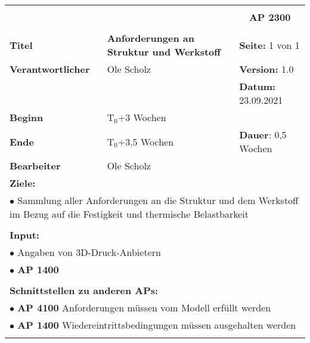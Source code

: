 \clearpage
\begin{table}[!h]
	\begin{center}
		\begin{tabular}{|p{35mm}||p{55mm}|p{50mm}||p{40mm}|}
			\hline
			\multicolumn{3}{|l||}{\textbf{}} & \multicolumn{1}{c|}{}\\
			\multicolumn{3}{|l||}{\textbf{}} & \multicolumn{1}{c|}{\textbf{AP 2300}}\\
			\multicolumn{3}{|l||}{\textbf{}} & \multicolumn{1}{c|}{}\\
			\hline\hline
			\textbf{Titel} & \multicolumn{2}{p{7cm}||}{\textbf{Anforderungen an Struktur und Werkstoff}} 
			& \textbf{Seite:} 1 von 1\\
			\hline
			\textbf{Verantwortlicher} & \multicolumn{2}{l||}{Ole Scholz} & \textbf{Version:} 1.0\\
			\hline
			\multicolumn{3}{|l||}{} & \textbf{Datum:} 23.09.2021\\
			\hline\hline
			\textbf{Beginn} & \multicolumn{2}{l||}{T$_0$+3 Wochen} & \\
			\hline
			\textbf{Ende} & \multicolumn{2}{l||}{T$_0$+3,5 Wochen} & \textbf{Dauer}: 0,5 Wochen\\
			\hline\hline
			\textbf{Bearbeiter} & \multicolumn{3}{l|}{Ole Scholz}\\
			\hline\hline
			\multicolumn{4}{|p{150mm}|}{\textbf{Ziele:}}\\
			\multicolumn{4}{|p{150mm}|}{$\bullet$ Sammlung aller Anforderungen an die Struktur und dem Werkstoff im Bezug auf die Festigkeit und thermische Belastbarkeit}\\
			\multicolumn{4}{|p{150mm}|}{}\\
			\multicolumn{4}{|p{150mm}|}{\textbf{Input:}}\\
			\multicolumn{4}{|p{150mm}|}{$\bullet$ Angaben von 3D-Druck-Anbietern}\\
			\multicolumn{4}{|p{150mm}|}{$\bullet$ \textbf{AP 1400}}\\
			\multicolumn{4}{|p{150mm}|}{}\\
			\multicolumn{4}{|p{150mm}|}{\textbf{Schnittstellen zu anderen APs:}}\\
			\multicolumn{4}{|p{150mm}|}{$\bullet$ \textbf{AP 4100} Anforderungen müssen vom Modell erfüllt werden}\\
			\multicolumn{4}{|p{150mm}|}{$\bullet$ \textbf{AP 1400} Wiedereintrittsbedingungen müssen ausgehalten werden}\\
			\multicolumn{4}{|p{150mm}|}{}\\

\end{tabular}
\end{center}
\end{table}
